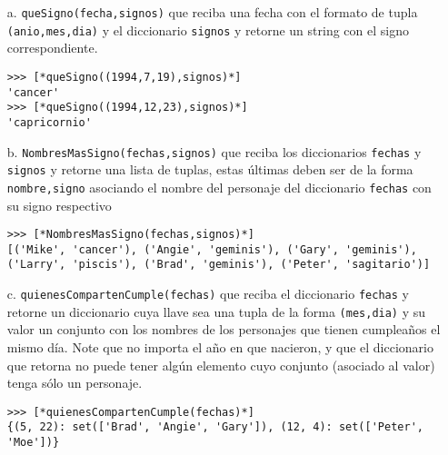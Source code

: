 \begin{itemize}
\item[a.] \texttt{queSigno(fecha,signos)} que reciba una fecha con el formato de tupla \texttt{(anio,mes,dia)} y el diccionario \texttt{signos} y retorne un string con el signo correspondiente.

\begin{lstlisting}[style=consola]
>>> [*queSigno((1994,7,19),signos)*]
'cancer'
>>> [*queSigno((1994,12,23),signos)*]
'capricornio'
\end{lstlisting}

\item[b.] \texttt{NombresMasSigno(fechas,signos)} que reciba los diccionarios \texttt{fechas} y \texttt{signos} y retorne una lista de tuplas, estas últimas deben ser de la forma \texttt{nombre,signo} asociando el nombre del personaje del diccionario \texttt{fechas} con su signo respectivo

\begin{lstlisting}[style=consola]
>>> [*NombresMasSigno(fechas,signos)*]
[('Mike', 'cancer'), ('Angie', 'geminis'), ('Gary', 'geminis'), 
('Larry', 'piscis'), ('Brad', 'geminis'), ('Peter', 'sagitario')]
\end{lstlisting}

\item[c.] \texttt{quienesCompartenCumple(fechas)} que reciba el diccionario \texttt{fechas} y retorne un diccionario cuya llave sea una tupla de la forma \texttt{(mes,dia)} y su valor un conjunto con los nombres de los personajes que tienen cumpleaños el mismo día. Note que no importa el año en que nacieron, y que el diccionario que retorna no puede tener algún elemento cuyo conjunto (asociado al valor) tenga sólo un personaje.

\begin{lstlisting}[style=consola]
>>> [*quienesCompartenCumple(fechas)*]
{(5, 22): set(['Brad', 'Angie', 'Gary']), (12, 4): set(['Peter', 'Moe'])}
\end{lstlisting}

\end{itemize}